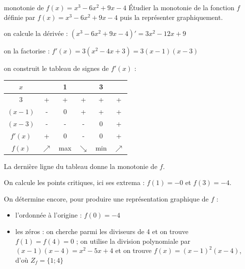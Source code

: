\documentclass[a4paper,12pt]{article}
\begin{document}
\begin{exemple}
	monotonie de $f(x)=x^3-6x^2+9x-4$
	\tcblower
Étudier la monotonie de la fonction $f$ définie par $f(x) = x^3 - 6x^2 + 9x - 4$ puis la représenter graphiquement.

on calcule la dérivée : $(x^3 - 6x^2 + 9x - 4)' = 3x^2 - 12x + 9$

on la factorise : $f'(x) = 3(x^2 - 4x + 3) = 3(x - 1)(x - 3)$

on construit le tableau de signes de $f'(x)$ :
\begin{center}
\begin{tabular}{|c|c|c|c|c|c|}
\hline
$x$ & & 1 & & 3 & \\
\hline
3 & + & + & + & + & + \\
\hline
$(x-1)$ & - & 0 & + & + & + \\
\hline
$(x-3)$ & - & - & - & 0 & + \\
\hline
$f'(x)$ & + & 0 & - & 0 & + \\
\hline
$f(x)$ & $\nearrow$ & max & $\searrow$ & min & $\nearrow$ \\
\hline
\end{tabular}
\end{center}

La dernière ligne du tableau donne la monotonie de $f$.

On calcule les points critiques, ici ses extrema : $f(1) = -0$ et $f(3) = -4$.

On détermine encore, pour produire une représentation graphique de $f$ :
\begin{itemize}
	\item l'ordonnée à l'origine : $f(0) = -4$
	\item les zéros : on cherche parmi les diviseurs de 4 et on trouve $f(1) = f(4) = 0$ ; on utilise la division polynomiale par $(x - 1)(x - 4) = x^2 - 5x + 4$ et on trouve $f(x) = (x - 1)^2(x - 4)$, d'où $Z_f = \{1; 4\}$
\end{itemize}
\end{exemple}
\end{document}

